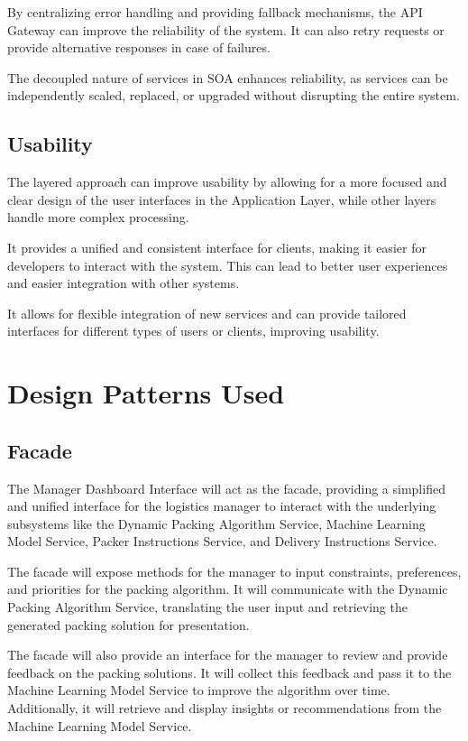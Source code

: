 \documentclass[a4paper,12pt]{article}
\begin{document}
By centralizing error handling and providing fallback mechanisms, the API Gateway can improve the reliability of the system. It can also retry requests or provide alternative responses in case of failures.

The decoupled nature of services in SOA enhances reliability, as services can be independently scaled, replaced, or upgraded without disrupting the entire system.

\subsection{Usability}
The layered approach can improve usability by allowing for a more focused and clear design of the user interfaces in the Application Layer, while other layers handle more complex processing.

It provides a unified and consistent interface for clients, making it easier for developers to interact with the system. This can lead to better user experiences and easier integration with other systems.

It allows for flexible integration of new services and can provide tailored interfaces for different types of users or clients, improving usability.

\section{Design Patterns Used}
\subsection{Facade}
The Manager Dashboard Interface will act as the facade, providing a simplified and unified interface for the logistics manager to interact with the underlying subsystems like the Dynamic Packing Algorithm Service, Machine Learning Model Service, Packer Instructions Service, and Delivery Instructions Service.

The facade will expose methods for the manager to input constraints, preferences, and priorities for the packing algorithm. It will communicate with the Dynamic Packing Algorithm Service, translating the user input and retrieving the generated packing solution for presentation.

The facade will also provide an interface for the manager to review and provide feedback on the packing solutions. It will collect this feedback and pass it to the Machine Learning Model Service to improve the algorithm over time. Additionally, it will retrieve and display insights or recommendations from the Machine Learning Model Service.
\end{document}
